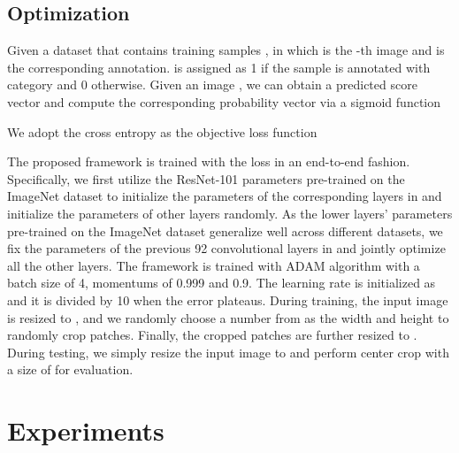 \documentclass[10pt,twocolumn,letterpaper]{article}
\begin{document}
\subsection{Optimization}
\label{sec:optimization}
Given a dataset that contains  training samples , in which  is the -th image and  is the corresponding annotation.  is assigned as 1 if the sample is annotated with category  and 0 otherwise. Given an image , we can obtain a predicted score vector  and compute the corresponding probability vector  via a sigmoid function

We adopt the cross entropy as the objective loss function



The proposed framework is trained with the loss  in an end-to-end fashion. Specifically, we first utilize the ResNet-101 parameters pre-trained on the ImageNet dataset \cite{deng2009imagenet} to initialize the parameters of the corresponding layers in  and initialize the parameters of other layers randomly. As the lower layers' parameters pre-trained on the ImageNet dataset generalize well across different datasets, we fix the parameters of the previous 92 convolutional layers in  and jointly optimize all the other layers. The framework is trained with ADAM algorithm \cite{kingma2014adam} with a batch size of 4, momentums of 0.999 and 0.9. The learning rate is initialized as  and it is divided by 10 when the error plateaus. During training, the input image is resized to , and we randomly choose a number from  as the width and height to randomly crop patches. Finally, the cropped patches are further resized to . During testing, we simply resize the input image to  and perform center crop with a size of  for evaluation.



\section{Experiments}
\end{document}
